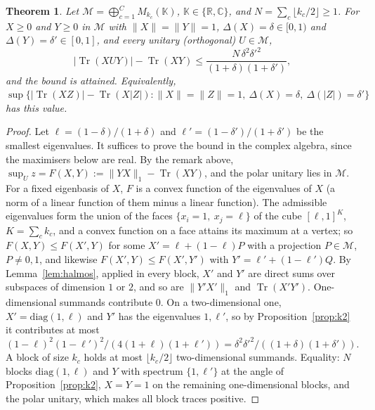 \documentclass[11pt]{article}
\DeclareMathOperator{\Tr}{Tr}
\newcommand{\C}{\mathbb{C}}
\newcommand{\R}{\mathbb{R}}
\newcommand{\M}{\mathcal{M}}
\theoremstyle{plain}
\newtheorem{theorem}{Theorem}[section]
\theoremstyle{definition}
\theoremstyle{remark}
\begin{document}
\begin{theorem}\label{thm:gardner2}
Let $\M=\bigoplus_{c=1}^CM_{k_c}(\mathbb K)$, $\mathbb K\in\{\R,\C\}$, and $N=\sum_c\lfloor k_c/2\rfloor\ge1$. For $X\ge0$ and
$Y\ge0$ in $\M$ with $\|X\|=\|Y\|=1$, $\Delta(X)=\delta\in[0,1)$ and $\Delta(Y)=\delta'\in[0,1]$, and every unitary
(orthogonal) $U\in\M$,
\[
  |\Tr(XUY)|-\Tr(XY)\le\frac{N\,\delta^2\delta'^2}{(1+\delta)(1+\delta')},
\]
and the bound is attained. Equivalently, $\sup\{|\Tr(XZ)|-\Tr(X|Z|):\|X\|=\|Z\|=1,\ \Delta(X)=\delta,\ \Delta(|Z|)=\delta'\}$
has this value.
\end{theorem}
\begin{proof}
Let $\ell=(1-\delta)/(1+\delta)$ and $\ell'=(1-\delta')/(1+\delta')$ be the smallest eigenvalues. It suffices to prove the
bound in the complex algebra, since the maximisers below are real. By the remark above, $\sup_Uz=F(X,Y):=\|YX\|_1-\Tr(XY)$,
and the polar unitary lies in $\M$. For a fixed eigenbasis of $X$, $F$ is a convex function of the eigenvalues of $X$ (a
norm of a linear function of them minus a linear function). The admissible eigenvalues form the union of the faces
$\{x_i=1,\ x_j=\ell\}$ of the cube $[\ell,1]^K$, $K=\sum_ck_c$, and a convex function on a face attains its maximum at a vertex; so
$F(X,Y)\le F(X',Y)$ for some $X'=\ell+(1-\ell)P$ with a projection $P\in\M$, $P\ne0,1$, and likewise $F(X',Y)\le F(X',Y')$
with $Y'=\ell'+(1-\ell')Q$. By Lemma~\ref{lem:halmos}, applied in every block, $X'$ and $Y'$ are direct sums over subspaces of
dimension $1$ or $2$, and so are $\|Y'X'\|_1$ and $\Tr(X'Y')$. One-dimensional summands contribute $0$. On a
two-dimensional one, $X'=\mathrm{diag}(1,\ell)$ and $Y'$ has the eigenvalues $1,\ell'$, so by Proposition~\ref{prop:k2} it
contributes at most $(1-\ell)^2(1-\ell')^2/(4(1+\ell)(1+\ell'))=\delta^2\delta'^2/((1+\delta)(1+\delta'))$. A block of size
$k_c$ holds at most $\lfloor k_c/2\rfloor$ two-dimensional summands. Equality: $N$ blocks $\mathrm{diag}(1,\ell)$ and
$Y$ with spectrum $\{1,\ell'\}$ at the angle of Proposition~\ref{prop:k2}, $X=Y=1$ on the remaining one-dimensional blocks,
and the polar unitary, which makes all block traces positive.
\end{proof}
\end{document}

